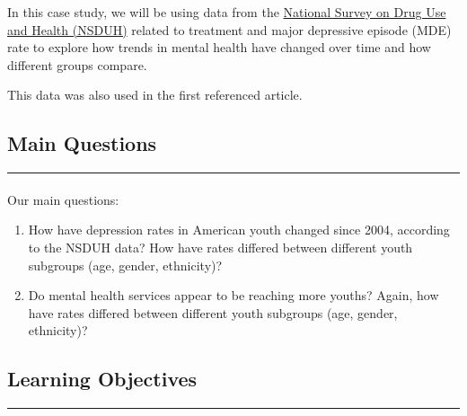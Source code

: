 \documentclass[
]{article}
\providecommand{\tightlist}{%
  \setlength{\itemsep}{0pt}\setlength{\parskip}{0pt}}
\begin{document}
In this case study, we will be using data from the
\href{https://nsduhweb.rti.org/respweb/homepage.cfm}{National Survey on
Drug Use and Health (NSDUH)} related to treatment and major depressive
episode (MDE) rate to explore how trends in mental health have changed
over time and how different groups compare.

This data was also used in the first referenced article.

\hypertarget{main-questions}{%
\subsection{\texorpdfstring{\textbf{Main
Questions}}{Main Questions}}\label{main-questions}}

\begin{center}\rule{0.5\linewidth}{0.5pt}\end{center}

\hypertarget{section-12}{%
\paragraph{}\label{section-12}}

Our main questions:

\begin{enumerate}
\def\labelenumi{\arabic{enumi}.}
\tightlist
\item
  How have depression rates in American youth changed since 2004,
  according to the NSDUH data? How have rates differed between different
  youth subgroups (age, gender, ethnicity)?
\item
  Do mental health services appear to be reaching more youths? Again,
  how have rates differed between different youth subgroups (age,
  gender, ethnicity)?
\end{enumerate}

\hypertarget{section-13}{%
\paragraph{}\label{section-13}}

\hypertarget{learning-objectives}{%
\subsection{\texorpdfstring{\textbf{Learning
Objectives}}{Learning Objectives}}\label{learning-objectives}}

\begin{center}\rule{0.5\linewidth}{0.5pt}\end{center}
\end{document}

